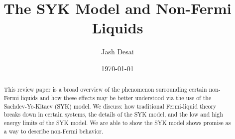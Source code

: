 \documentclass[reprint]{revtex4-2}
\begin{document}

\title{The SYK Model and Non-Fermi Liquids}%


\author{Jash Desai}

\date{\today}%

\begin{abstract}
This review paper is a broad overview of the phenomenon surrounding certain non-Fermi liquids and how these effects may be better understood via the use of the Sachdev-Ye-Kitaev (SYK) model. We discuss: how traditional Fermi-liquid theory breaks down in certain systems, the details of the SYK model, and the low and high energy limits of the SYK model. We are able to show the SYK model shows promise as a way to describe non-Fermi behavior. 
\end{abstract}

\maketitle

\end{document}
